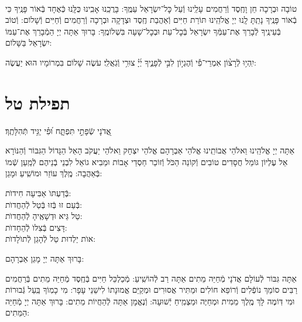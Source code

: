 \documentclass[twoside, openany, parskip=half, 11pt]{book}
\begin{document}
\shatz\\
טוֹבָה וּבְרָכָה חֵן וָחֶֽסֶד וְֿרַחֲמִים עָלֵֽינוּ וְֿעַל כׇּל־יִשְׂרָאֵל עַמֶּֽךָ: בָּרֲכֵֽנוּ אָבִֽינוּ כֻּלָּֽנוּ כְּֿאֶחָד בְּֿאוֹר פָּנֶֽיךָ כִּי בְֿאוֹר פָּנֶֽיךָ נָתַֽתָּ לָֽנוּ יְיָ אֱלֹהֵֽינוּ תּוֹרַת חַיִּים וְֿאַהֲבַת חֶֽסֶד וּצְדָקָה וּבְרָכָה וְֿרַחֲמִים וְֿחַיִּים וְֿשָׁלוֹם: וְֿטוֹב בְּֿעֵינֶֽיךָ לְֿבָרֵךְ אֶת־עַמְּֿךָ יִשְׂרָאֵל בְּֿכׇל־עֵת וּבְכׇל־שָׁעָה בִּשְׁלוֹמֶֽךָ: בָּרוּךְ אַתָּה יְיָ הַמְֿבָרֵךְ אֶת־עַמּוֹ יִשְׂרָאֵל בַּשָּׁלוֹם:

יִֽהְי֥וּ לְֿרָצ֨וֹן אִמְרֵי־פִ֡י וְֿהֶגְי֣וֹן לִבִּ֣י לְֿפָנֶ֑יךָ יְ֜יָ֗ צוּרִ֥י וְֿגֹֽאֲלִֽי׃ עֹשֶׂה שָׁלוֹם בִּמְרוֹמָיו הוּא יַעֲשֶׂה:

\vfill
{}


\sepline

\clearpage

\section[תפילת טל]{ תפילת טל }
\label{tefilastal}


\begin{small}
אֲ֭דֹנָי שְֿׂפָתַ֣י תִּפְתָּ֑ח וּ֝פִ֗י יַגִּ֥יד תְּֿהִלָּתֶֽךָ׃
\\
\end{small}
אַתָּה יְיָ אֱלֹהֵֽינוּ וֵאלֹהֵי אֲבוֹתֵֽינוּ אֱלֹהֵי אַבְרָהָם אֱלֹהֵי יִצְחָק וֵאלֹהֵי יַעֲקֹב הָאֵל הַגָּדוֹל הַגִּבּוֹר וְֿהַנּוֹרָא אֵל עֶלְיוֹן גּוֹמֵל חֲסָדִים טוֹבִים וְֿקוֹנֵה הַכֹּל וְֿזוֹכֵר חַסְדֵי אָבוֹת וּמֵבִיא גוֹאֵל לִבְנֵי בְֿנֵיהֶם לְֿמַֽעַן שְֿׁמוֹ בְּֿאַהֲבָה: מֶֽלֶךְ עוֹזֵר וּמוֹשִֽׁיעַ וּמָגֵן:


\begin{large}
בְּֿדַעְתּוׂ אַבִּיעָה חִידוׂת: \\
בְּֿעַם זוּ בְּֿזוּ בְּֿטַל לְֿהַחֲדוׂת:\\
טַל גֵּיא וּדְשָׁאֶֽיהָ לְֿהַחֲדוׂת: \\
דָּצִים בְּֿצִלּוׂ לְֿהֵחָדוׂת:\\
אוׂת יַלְדוּת טַל לְֿהָגֵן לְֿתוׂלָדוׂת:

\end{large}


בָּרוּךְ אַתָּה יְיָ מָגֵן אַבְרָהָם:

אַתָּה גִּבּוֹר לְֿעוֹלָם אֲדֹנָי מְֿחַיֵּה מֵתִים אַתָּה רַב לְֿהוֹשִֽׁיעַ: מְֿכַלְכֵּל חַיִּים בְּֿחֶֽסֶד מְֿחַיֵּה מֵתִים בְּֿרַחֲמִים רַבִּים סוֹמֵךְ נוֹפְֿלִים וְֿרוֹפֵא חוֹלִים וּמַתִּיר אֲסוּרִים וּמְקַיֵּם אֱמוּנָתוֹ לִישֵׁנֵי עָפָר: מִי כָמֽוֹךָ בַּֽעַל גְּֿבוּרוֹת וּמִי דּֽוֹמֶה לָּךְ מֶֽלֶךְ מֵמִית וּמְחַיֶּה וּמַצְמִֽיחַ יְֿשׁוּעָה: וְֿנֶאֱמָן אַתָּה לְֿהַחֲיוֹת מֵתִים: בָּרוּךְ אַתָּה יְיָ מְֿחַיֵּה הַמֵּתִים:
\end{document}
